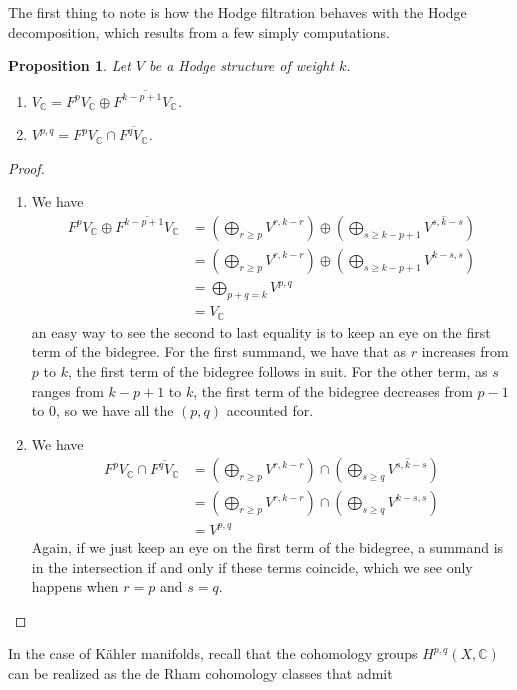 \documentclass[psamsfonts, 12pt]{amsart}
\newtheorem{prop}[thm]{Proposition}
\theoremstyle{definition}
\theoremstyle{remark}
\newcommand{\C}{\mathbb{C}}
\newcommand{\enumbreak}{\ \\ \vspace{-\baselineskip}}
\begin{document}
%
The first thing to note is how the Hodge filtration behaves with the Hodge
decomposition, which results from a few simply computations.
%
\begin{prop}
Let $V$ be a Hodge structure of weight $k$.
\begin{enumerate}
  \item $V_\C = F^pV_\C \oplus \overline{F^{k-p+1}V_\C}$.
  \item $V^{p,q} = F^pV_\C \cap \overline{F^qV_\C}$.
\end{enumerate}
\end{prop}
%
\begin{proof} \enumbreak
\begin{enumerate}
  \item We have
  \begin{align*}
  F^pV_\C \oplus \overline{F^{k-p+1}V_\C}
  &= \left(\bigoplus_{r \geq p} V^{r,k-r}\right) \oplus
  \left(\bigoplus_{s \geq k-p+1}\overline{V^{s,k-s}}\right) \\
  &= \left(\bigoplus_{r \geq p} V^{r,k-r}\right) \oplus
  \left(\bigoplus_{s \geq k-p+1}V^{k-s,s}\right) \\
  &= \bigoplus_{p+q = k} V^{p,q} \\
  &= V_\C
  \end{align*}
  an easy way to see the second to last equality is to keep an eye on the first
  term of the bidegree. For the first summand, we have that as $r$ increases
  from $p$ to $k$, the first term of the bidegree follows in suit. For the
  other term, as $s$ ranges from $k-p+1$ to $k$, the first term of the bidegree
  decreases from $p-1$ to $0$, so we have all the $(p,q)$ accounted for.
  \item We have
  \begin{align*}
  F^pV_\C \cap \overline{F^qV_\C}
  &= \left(\bigoplus_{r \geq p} V^{r,k-r}\right)
  \cap \left(\bigoplus_{s\geq q} \overline{V^{s,k-s}}\right) \\
  &= \left(\bigoplus_{r \geq p} V^{r,k-r}\right)
  \cap \left(\bigoplus_{s\geq q} V^{k-s,s}\right) \\
  &= V^{p,q}
  \end{align*}
  Again, if we just keep an eye on the first term of the bidegree, a
  summand is in the intersection if and only if these terms coincide,
  which we see only happens when $r = p$ and $s = q$.
\end{enumerate}
\end{proof}
%
In the case of K\"ahler manifolds, recall that the cohomology groups
$H^{p,q}(X,\C)$ can be realized as the de Rham cohomology classes that admit
\end{document}
